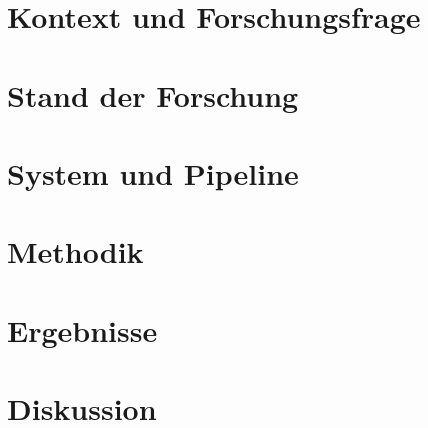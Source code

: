 \documentclass[11pt,a4paper,oneside,open=any,parskip=half-]{scrreprt}
\begin{document}
\tableofcontents
\listoffigures
\listoftables

\part{Kontext und Forschungsfrage}



\part{Stand der Forschung}



\part{System und Pipeline}



\part{Methodik}



\part{Ergebnisse}



\part{Diskussion}
\end{document}
